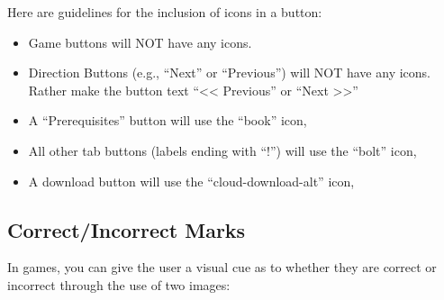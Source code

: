 \documentclass[
]{book}
\providecommand{\tightlist}{%
  \setlength{\itemsep}{0pt}\setlength{\parskip}{0pt}}
\begin{document}
Here are guidelines for the inclusion of icons in a button:

\begin{itemize}
\tightlist
\item
  Game buttons will NOT have any icons.
\item
  Direction Buttons (e.g., ``Next'' or ``Previous'') will NOT have any icons. Rather make the button text ``\textless\textless{} Previous'' or ``Next \textgreater\textgreater{}''
\item
  A ``Prerequisites'' button will use the ``book'' icon, 
\item
  All other tab buttons (labels ending with ``!'') will use the ``bolt'' icon, 
\item
  A download button will use the ``cloud-download-alt'' icon, 
\end{itemize}

\hypertarget{correctincorrect-marks-1}{%
\subsection{Correct/Incorrect Marks}\label{correctincorrect-marks-1}}

In games, you can give the user a visual cue as to whether they are correct or incorrect through the use of two images:
\end{document}
